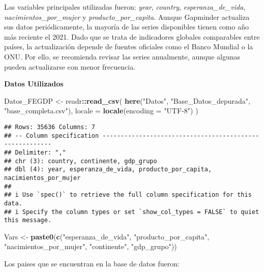 \documentclass[
]{article}
\newenvironment{Shaded}{\begin{snugshade}}{\end{snugshade}}
\newcommand{\AttributeTok}[1]{\textcolor[rgb]{0.13,0.29,0.53}{#1}}
\newcommand{\FunctionTok}[1]{\textcolor[rgb]{0.13,0.29,0.53}{\textbf{#1}}}
\newcommand{\NormalTok}[1]{#1}
\newcommand{\OtherTok}[1]{\textcolor[rgb]{0.56,0.35,0.01}{#1}}
\newcommand{\SpecialCharTok}[1]{\textcolor[rgb]{0.81,0.36,0.00}{\textbf{#1}}}
\newcommand{\StringTok}[1]{\textcolor[rgb]{0.31,0.60,0.02}{#1}}
\begin{document}
Las variables principales utilizadas fueron: \emph{year},
\emph{country}, \emph{esperanza\_de\_vida},
\emph{nacimientos\_por\_mujer} y \emph{producto\_por\_capita}. Aunque
Gapminder actualiza sus datos periódicamente, la mayoría de las series
disponibles tienen como año más reciente el 2021. Dado que se trata de
indicadores globales comparables entre países, la actualización depende
de fuentes oficiales como el Banco Mundial o la ONU. Por ello, se
recomienda revisar las series anualmente, aunque algunas pueden
actualizarse con menor frecuencia.

\textbf{Datos Utilizados}

\begin{Shaded}
\begin{Highlighting}[]
\NormalTok{Datos\_FEGDP }\OtherTok{\textless{}{-}}\NormalTok{ readr}\SpecialCharTok{::}\FunctionTok{read\_csv}\NormalTok{(}
  \FunctionTok{here}\NormalTok{(}\StringTok{"Datos"}\NormalTok{, }\StringTok{"Base\_Datos\_depurada"}\NormalTok{, }\StringTok{"base\_completa.csv"}\NormalTok{),}
  \AttributeTok{locale =} \FunctionTok{locale}\NormalTok{(}\AttributeTok{encoding =} \StringTok{"UTF{-}8"}\NormalTok{)}
\NormalTok{)}
\end{Highlighting}
\end{Shaded}

\begin{verbatim}
## Rows: 35636 Columns: 7
## -- Column specification --------------------------------------------------------
## Delimiter: ","
## chr (3): country, continente, gdp_grupo
## dbl (4): year, esperanza_de_vida, producto_por_capita, nacimientos_por_mujer
## 
## i Use `spec()` to retrieve the full column specification for this data.
## i Specify the column types or set `show_col_types = FALSE` to quiet this message.
\end{verbatim}

\begin{Shaded}
\begin{Highlighting}[]
\NormalTok{Vars }\OtherTok{\textless{}{-}} \FunctionTok{paste0}\NormalTok{(}\FunctionTok{c}\NormalTok{(}\StringTok{"esperanza\_de\_vida"}\NormalTok{, }\StringTok{"producto\_por\_capita"}\NormalTok{, }\StringTok{"nacimientos\_por\_mujer"}\NormalTok{, }\StringTok{"continente"}\NormalTok{, }\StringTok{"gdp\_grupo"}\NormalTok{)) }
\end{Highlighting}
\end{Shaded}

Los paises que se encuentran en la base de datos fueron:
\end{document}
